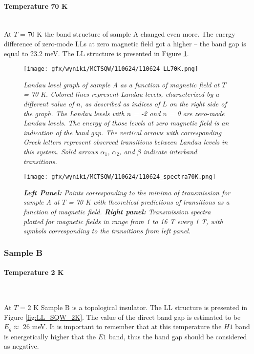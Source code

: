 \documentclass[titlepage,a4paper]{book}
\newcommand{\wciecie}{\quad\phantom{v}}
\newcommand{\myparagraph}[1]{\paragraph{#1}\mbox{}\\}
\begin{document}
\clearpage
\myparagraph{Temperature 70 K}
\wciecie
At $T$ = 70 K the band structure of sample A changed even more. The energy difference of zero-mode LLs at zero magnetic field got a higher -- the band gap is equal to 23.2 meV. The LL structure is presented in Figure \ref{fig:LL_110624_70K}.

\begin{figure}[ht]
	\centering
	\texttt{[image: gfx/wyniki/MCTSQW/110624/110624\_LL70K.png]}
	\vspace{-10pt}
	\caption{\textit{Landau level graph of sample A as a function of magnetic field at $T$ = 70 K. Colored lines represent Landau levels, characterized by a different value of $n$, as described as indices of $L$ on the right side of the graph. The Landau levels with $n$ = -2 and $n$ = 0 are zero-mode Landau levels. The energy of those levels at zero magnetic field is an indication of the band gap. The vertical arrows with corresponding Greek letters represent observed transitions between Landau levels in this system. Solid arrows $\alpha_1$, $\alpha_2$, and $\beta$ indicate interband transitions.}}
	\label{fig:LL_110624_70K}
\end{figure}

\begin{figure}[ht]
	\centering
	\texttt{[image: gfx/wyniki/MCTSQW/110624/110624\_spectra70K.png]}
	\vspace{-10pt}
	\caption{\textit{\textbf{Left Panel:} Points corresponding to the minima of transmission for sample A at $T$ = 70 K with theoretical predictions of transitions as a function of magnetic field. \textbf{Right panel:} Transmission spectra plotted for magnetic fields in range from 1 to 16 T every 1 T, with symbols corresponding to the transitions from left panel.}}
	\label{fig:Spectra_110624_70K}
\end{figure}

\clearpage
\subsubsection{Sample B}
\myparagraph{Temperature 2 K}
\wciecie

At $T$ = 2 K Sample B is a topological insulator. The LL structure is presented in Figure \ref{fig:LL_SQW_2K}. The value of the direct band gap is estimated to be $E_g \approx $ 26 meV. It is important to remember that at this temperature the $H1$ band is energetically higher that the $E1$ band, thus the band gap should be considered as negative.
\end{document}
